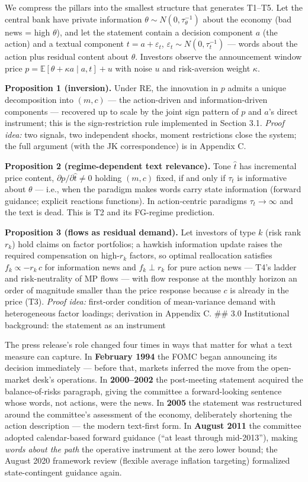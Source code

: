 \documentclass[11pt]{article}
\begin{document}
We compress the pillars into the smallest structure that generates T1--T5. Let the central bank have private information \(\theta \sim N(0, \tau_\theta^{-1})\) about the economy (bad news = high \(\theta\)), and let the statement contain a decision component \(a\) (the action) and a textual component \(t = a + \varepsilon_t\), \(\varepsilon_t \sim N(0, \tau_t^{-1})\) --- words about the action plus residual content about \(\theta\). Investors observe the announcement window price \(p = \mathbb{E}[\theta + \kappa a \mid a, t] + u\) with noise \(u\) and risk-aversion weight \(\kappa\).

\textbf{Proposition 1 (inversion).} Under RE, the innovation in \(p\) admits a unique decomposition into \((m, c)\) --- the action-driven and information-driven components --- recovered up to scale by the joint sign pattern of \(p\) and \(a\)'s direct instrument; this is the sign-restriction rule implemented in Section 3.1. \emph{Proof idea:} two signals, two independent shocks, moment restrictions close the system; the full argument (with the JK correspondence) is in Appendix C.

\textbf{Proposition 2 (regime-dependent text relevance).} Tone \(\hat t\) has incremental price content, \(\partial p / \partial \hat t \neq 0\) holding \((m, c)\) fixed, if and only if \(\tau_t\) is informative about \(\theta\) --- i.e., when the paradigm makes words carry state information (forward guidance; explicit reactions functions). In action-centric paradigms \(\tau_t \to \infty\) and the text is dead. This is T2 and its FG-regime prediction.

\textbf{Proposition 3 (flows as residual demand).} Let investors of type \(k\) (risk rank \(r_k\)) hold claims on factor portfolios; a hawkish information update raises the required compensation on high-\(r_k\) factors, so optimal reallocation satisfies \(f_k \propto -r_k \, c\) for information news and \(f_k \perp r_k\) for pure action news --- T4's ladder and risk-neutrality of MP flows --- with flow response at the monthly horizon an order of magnitude smaller than the price response because \(c\) is already in the price (T3). \emph{Proof idea:} first-order condition of mean-variance demand with heterogeneous factor loadings; derivation in Appendix C. \#\# 3.0 Institutional background: the statement as an instrument

The press release's role changed four times in ways that matter for what a text measure can capture. In \textbf{February 1994} the FOMC began announcing its decision immediately --- before that, markets inferred the move from the open-market desk's operations. In \textbf{2000--2002} the post-meeting statement acquired the balance-of-risks paragraph, giving the committee a forward-looking sentence whose words, not actions, were the news. In \textbf{2005} the statement was restructured around the committee's assessment of the economy, deliberately shortening the action description --- the modern text-first form. In \textbf{August 2011} the committee adopted calendar-based forward guidance (``at least through mid-2013''), making \emph{words about the path} the operative instrument at the zero lower bound; the August 2020 framework review (flexible average inflation targeting) formalized state-contingent guidance again.
\end{document}
